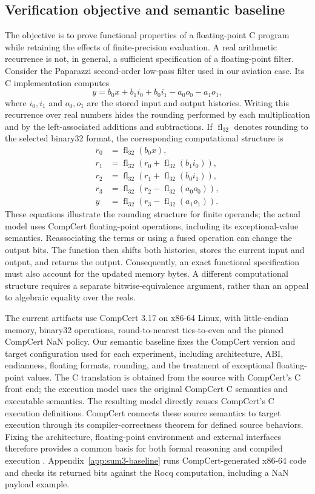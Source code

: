 \documentclass[manuscript, screen, review]{acmart}
\begin{document}
\subsection{Verification objective and semantic baseline}

The objective is to prove functional properties of a floating-point C
program while retaining the effects of finite-precision evaluation. A real
arithmetic recurrence is not, in general, a sufficient specification of a
floating-point filter. Consider the Paparazzi second-order low-pass filter
used in our aviation case. Its C implementation computes
\[
 y = b_0 x + b_1 i_0 + b_0 i_1 - a_0 o_0 - a_1 o_1,
\]
where $i_0,i_1$ and $o_0,o_1$ are the stored input and output histories.
Writing this recurrence over real numbers hides the rounding performed by
each multiplication and by the left-associated additions and subtractions.
If $\operatorname{fl}_{32}$ denotes rounding to the selected binary32
format, the corresponding computational structure is
\[
\begin{aligned}
 r_0 &= \operatorname{fl}_{32}(b_0 x),\\
 r_1 &= \operatorname{fl}_{32}(r_0+\operatorname{fl}_{32}(b_1 i_0)),\\
 r_2 &= \operatorname{fl}_{32}(r_1+\operatorname{fl}_{32}(b_0 i_1)),\\
 r_3 &= \operatorname{fl}_{32}(r_2-\operatorname{fl}_{32}(a_0 o_0)),\\
 y   &= \operatorname{fl}_{32}(r_3-\operatorname{fl}_{32}(a_1 o_1)).
\end{aligned}
\]
These equations illustrate the rounding structure for finite operands;
the actual model uses CompCert floating-point operations, including its
exceptional-value semantics. Reassociating the terms or using a fused
operation can change the output bits. The function then shifts both
histories, stores the current input and output, and returns the output.
Consequently, an exact functional specification must also account for the
updated memory bytes. A different computational structure requires a
separate bitwise-equivalence argument, rather than an appeal to algebraic
equality over the reals.

The current artifacts use CompCert 3.17 on x86-64 Linux, with little-endian
memory, binary32 operations, round-to-nearest ties-to-even and the pinned
CompCert NaN policy. Our semantic baseline fixes the CompCert version and target configuration
used for each experiment, including architecture, ABI, endianness, floating
formats, rounding, and the treatment of exceptional floating-point values.
The C translation is obtained from the source with CompCert's C front end;
the execution model uses the original CompCert C semantics and executable
semantics. The resulting model directly reuses CompCert's C execution definitions. CompCert connects these source semantics to target execution through its
compiler-correctness theorem for defined source behaviors. Fixing the
architecture, floating-point environment and external interfaces therefore
provides a common basis for both formal reasoning and compiled execution
\cite{Leroy2009}. Appendix~\ref{app:sum3-baseline} runs CompCert-generated
x86-64 code and checks its returned bits against the Rocq computation,
including a NaN payload example.
\end{document}
